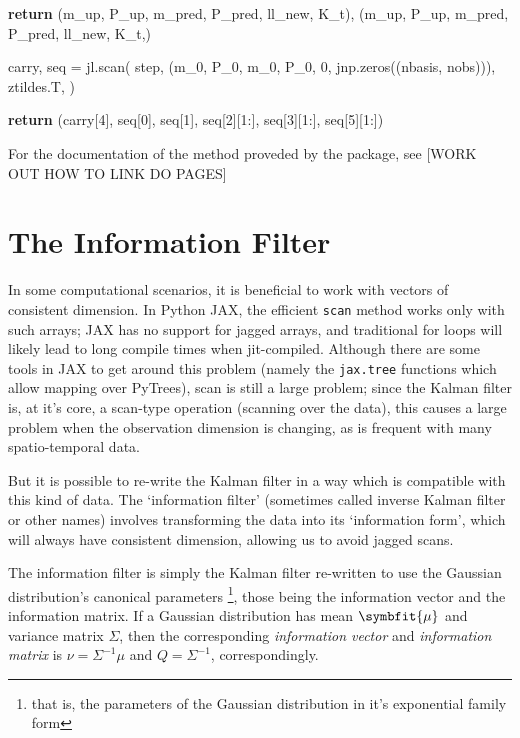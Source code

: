 \documentclass[
]{report}
\newenvironment{Shaded}{\begin{snugshade}}{\end{snugshade}}
\newcommand{\ControlFlowTok}[1]{\textcolor[rgb]{0.00,0.23,0.31}{\textbf{#1}}}
\newcommand{\DecValTok}[1]{\textcolor[rgb]{0.68,0.00,0.00}{#1}}
\newcommand{\NormalTok}[1]{\textcolor[rgb]{0.00,0.23,0.31}{#1}}
\newcommand{\OperatorTok}[1]{\textcolor[rgb]{0.37,0.37,0.37}{#1}}
\newcommand{\bv}[1]{\symbfit{#1}}
\theoremstyle{plain}
\theoremstyle{plain}
\theoremstyle{plain}
\theoremstyle{remark}
\begin{document}
\begin{Shaded}
\begin{Highlighting}[]
        \ControlFlowTok{return}\NormalTok{ (m\_up, P\_up, m\_pred, P\_pred, ll\_new, K\_t), (m\_up, P\_up, m\_pred, P\_pred, ll\_new, K\_t,)}

\NormalTok{    carry, seq }\OperatorTok{=}\NormalTok{ jl.scan(}
\NormalTok{        step,}
\NormalTok{        (m\_0, P\_0, m\_0, P\_0, }\DecValTok{0}\NormalTok{, jnp.zeros((nbasis, nobs))),}
\NormalTok{        ztildes.T,}
\NormalTok{    )}

    \ControlFlowTok{return}\NormalTok{ (carry[}\DecValTok{4}\NormalTok{], seq[}\DecValTok{0}\NormalTok{], seq[}\DecValTok{1}\NormalTok{], seq[}\DecValTok{2}\NormalTok{][}\DecValTok{1}\NormalTok{:], seq[}\DecValTok{3}\NormalTok{][}\DecValTok{1}\NormalTok{:], seq[}\DecValTok{5}\NormalTok{][}\DecValTok{1}\NormalTok{:])}
\end{Highlighting}
\end{Shaded}

\normalsize

For the documentation of the method proveded by the package, see {[}WORK
OUT HOW TO LINK DO PAGES{]}

\section{The Information Filter}\label{the-information-filter}

In some computational scenarios, it is beneficial to work with vectors
of consistent dimension. In Python JAX, the efficient \texttt{scan}
method works only with such arrays; JAX has no support for jagged
arrays, and traditional for loops will likely lead to long compile times
when jit-compiled. Although there are some tools in JAX to get around
this problem (namely the \texttt{jax.tree} functions which allow mapping
over PyTrees), scan is still a large problem; since the Kalman filter
is, at it's core, a scan-type operation (scanning over the data), this
causes a large problem when the observation dimension is changing, as is
frequent with many spatio-temporal data.

But it is possible to re-write the Kalman filter in a way which is
compatible with this kind of data. The `information filter' (sometimes
called inverse Kalman filter or other names) involves transforming the
data into its `information form', which will always have consistent
dimension, allowing us to avoid jagged scans.

The information filter is simply the Kalman filter re-written to use the
Gaussian distribution's canonical parameters \footnote{that is, the
  parameters of the Gaussian distribution in it's exponential family
  form}, those being the information vector and the information matrix.
If a Gaussian distribution has mean \(\bv\mu\) and variance matrix
\(\Sigma\), then the corresponding \emph{information vector} and
\emph{information matrix} is \(\nu = \Sigma^{-1}\mu\) and
\(Q = \Sigma^{-1}\), correspondingly.
\end{document}
